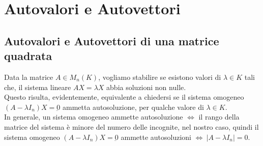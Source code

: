 \documentclass[../main.tex]{subfiles}
\begin{document}
\section{Autovalori e Autovettori}

\subsection{Autovalori e Autovettori di una matrice quadrata}
Data la matrice $A\in M_n(K)$, vogliamo stabilire se esistono valori di
$\lambda \in K$ tali che, il sistema lineare $AX=\lambda X$ abbia soluzioni non
nulle.\\ Questo risulta, evidentemente, equivalente a chiedersi se il sistema
omogeneo $(A-\lambda I_n)X = \underbar{0}$ ammetta autosoluzione, per qualche
valore di $\lambda\in K$.\\ In generale, un sistema omogeneo ammette
autosoluzione $\iff$ il rango della matrice del sistema è minore del numero
delle incognite, nel nostro caso, quindi il sistema omogeneo $(A-\lambda
    I_n)X=\underbar{0}$ ammette autosoluzioni $\iff\ |A-\lambda I_n| = 0$.
\end{document}
